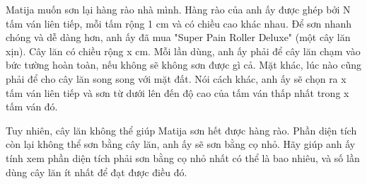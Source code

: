 Matija muốn sơn lại hàng rào nhà mình. Hàng rào của anh ấy được ghép bởi N tấm ván liên tiếp, mỗi tấm rộng 1 cm và có chiều cao khác nhau. Để sơn nhanh chóng và dễ dàng hơn, anh ấy đã mua "Super Pain Roller Deluxe" (một cây lăn xịn). Cây lăn có chiều rộng x cm. Mỗi lần dùng, anh ấy phải để cây lăn chạm vào bức tường hoàn toàn, nếu không sẽ không sơn được gì cả. Mặt khác, lúc nào cũng phải để cho cây lăn song song với mặt đất. Nói cách khác, anh ấy sẽ chọn ra x tấm ván liên tiếp và sơn từ dưới lên đến độ cao của tấm ván thấp nhất trong x tấm ván đó.  

   Tuy nhiên, cây lăn không thể giúp Matija sơn hết được hàng rào. Phần diện tích còn lại không thể sơn bằng cây lăn, anh ấy sẽ sơn bằng cọ nhỏ. Hãy giúp anh ấy tính xem phần diện tích phải sơn bằng cọ nhỏ nhất có thể là bao nhiêu, và số lần dùng cây lăn ít nhất để đạt được điều đó.  

\